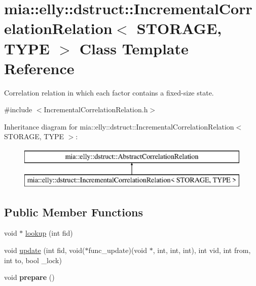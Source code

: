 \hypertarget{classmia_1_1elly_1_1dstruct_1_1_incremental_correlation_relation}{\section{mia\-:\-:elly\-:\-:dstruct\-:\-:Incremental\-Correlation\-Relation$<$ S\-T\-O\-R\-A\-G\-E, T\-Y\-P\-E $>$ Class Template Reference}
\label{classmia_1_1elly_1_1dstruct_1_1_incremental_correlation_relation}
}


Correlation relation in which each factor contains a fixed-\/size state.  




{\ttfamily \#include $<$Incremental\-Correlation\-Relation.\-h$>$}

Inheritance diagram for mia\-:\-:elly\-:\-:dstruct\-:\-:Incremental\-Correlation\-Relation$<$ S\-T\-O\-R\-A\-G\-E, T\-Y\-P\-E $>$\-:\begin{figure}[H]
\begin{center}
\leavevmode
\includegraphics[height=2.000000cm]{classmia_1_1elly_1_1dstruct_1_1_incremental_correlation_relation}
\end{center}
\end{figure}
\subsection*{Public Member Functions}
\begin{DoxyCompactItemize}
\item 
void $\ast$ \hyperlink{classmia_1_1elly_1_1dstruct_1_1_incremental_correlation_relation_a1fa71d31e19664412accbbc1e46d15aa}{lookup} (int fid)
\item 
void \hyperlink{classmia_1_1elly_1_1dstruct_1_1_incremental_correlation_relation_a8af326974d7d6f5a57809ac96d1a5f26}{update} (int fid, void($\ast$func\-\_\-update)(void $\ast$, int, int, int), int vid, int from, int to, bool \-\_\-lock)
\item 
\hypertarget{classmia_1_1elly_1_1dstruct_1_1_incremental_correlation_relation_af1bb0c78230b7b0b964f62d0af66ddb0}{void {\bfseries prepare} ()}\label{classmia_1_1elly_1_1dstruct_1_1_incremental_correlation_relation_af1bb0c78230b7b0b964f62d0af66ddb0}

\end{DoxyCompactItemize}

